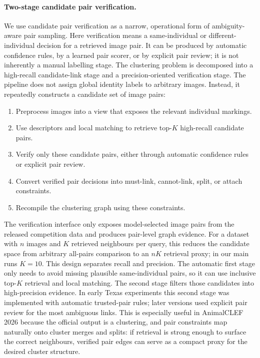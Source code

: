 \documentclass{ceurart}
\begin{document}
\paragraph{Two-stage candidate pair verification.}
We use candidate pair verification as a narrow, operational form of ambiguity-aware pair sampling. Here verification means a same-individual or different-individual decision for a retrieved image pair. It can be produced by automatic confidence rules, by a learned pair scorer, or by explicit pair review; it is not inherently a manual labelling stage. The clustering problem is decomposed into a high-recall candidate-link stage and a precision-oriented verification stage. The pipeline does not assign global identity labels to arbitrary images. Instead, it repeatedly constructs a candidate set of image pairs:
\begin{enumerate}[leftmargin=*]
  \item Preprocess images into a view that exposes the relevant individual markings.
  \item Use descriptors and local matching to retrieve top-$K$ high-recall candidate pairs.
  \item Verify only these candidate pairs, either through automatic confidence rules or explicit pair review.
  \item Convert verified pair decisions into must-link, cannot-link, split, or attach constraints.
  \item Recompile the clustering graph using these constraints.
\end{enumerate}
The verification interface only exposes model-selected image pairs from the released competition data and produces pair-level graph evidence. For a dataset with $n$ images and $K$ retrieved neighbours per query, this reduces the candidate space from arbitrary all-pairs comparison to an $nK$ retrieval proxy; in our main runs $K=10$.
This design separates recall and precision. The automatic first stage only needs to avoid missing plausible same-individual pairs, so it can use inclusive top-$K$ retrieval and local matching. The second stage filters those candidates into high-precision evidence. In early Texas experiments this second stage was implemented with automatic trusted-pair rules; later versions used explicit pair review for the most ambiguous links. This is especially useful in AnimalCLEF 2026 because the official output is a clustering, and pair constraints map naturally onto cluster merges and splits: if retrieval is strong enough to surface the correct neighbours, verified pair edges can serve as a compact proxy for the desired cluster structure.
\end{document}

